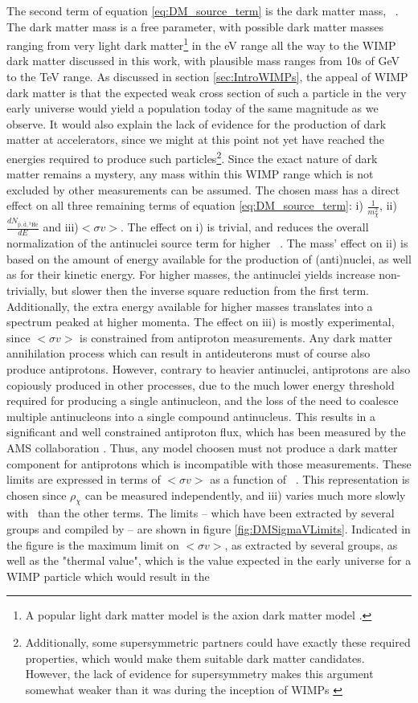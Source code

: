 The second term of equation \ref{eq:DM_source_term} is the dark matter mass, \dmm\ . The dark matter mass is a free parameter, with possible dark matter masses ranging from very light dark matter\footnote{A popular light dark matter model is the axion dark matter model \cite{}.} in the eV range all the way to the WIMP dark matter discussed in this work, with plausible mass ranges from 10s of GeV to the TeV range. As discussed in section \ref{sec:IntroWIMPs}, the appeal of WIMP dark matter is that the expected weak cross section of such a particle in the very early universe would yield a population today of the same magnitude as we observe. It would also explain the lack of evidence for the production of dark matter at accelerators, since we might at this point not yet have reached the energies required to produce such particles\footnote{Additionally, some supersymmetric partners could have exactly these required properties, which would make them suitable dark matter candidates\cite{}. However, the lack of evidence for supersymmetry makes this argument somewhat weaker than it was during the inception of WIMPs \cite{}}. Since the exact nature of dark matter remains a mystery, any mass within this WIMP range which is not excluded by other measurements can be assumed. The chosen mass has a direct effect on all three remaining terms of equation \ref{eq:DM_source_term}: i) $\frac{1}{m_\chi^2}$, ii) $\frac{dN_{\mathrm{\bar{p}, \bar{d}, {^3\overline{He}}}}}{dE}$  and iii)$<\sigma v>$. The effect on i) is trivial, and reduces the overall normalization of the antinuclei source term for higher \dmm\ . The mass' effect on ii) is based on the amount of energy available for the production of (anti)nuclei, as well as for their kinetic energy. For higher masses, the antinuclei yields increase non-trivially, but slower then the inverse square reduction from the first term. Additionally, the extra energy available for higher masses translates into a spectrum peaked at higher momenta. The effect on iii) is mostly experimental, since $<\sigma v>$ is constrained from antiproton measurements. Any dark matter annihilation process which can result in antideuterons must of course also produce antiprotons. However, contrary to heavier antinuclei, antiprotons are also copiously produced in other processes, due to the much lower energy threshold required for producing a single antinucleon, and the loss of the need to coalesce multiple antinucleons into a single compound antinucleus. This results in a significant and well constrained antiproton flux, which has been measured by the AMS collaboration \cite{}. Thus, any model choosen must not produce a dark matter component for antiprotons which is incompatible with those measurements. These limits are expressed in terms of $<\sigma v>$ as a function of \dmm\ . This representation is chosen since $\rho_\chi$ can be measured independently, and iii) varies much more slowly with \dmm\ than the other terms. The limits -- which have been extracted by several groups \cite{} and compiled by \cite{}-- are shown in figure \ref{fig:DMSigmaVLimits}. Indicated in the figure is the maximum limit on $<\sigma v>$, as extracted by several groups, as well as the "thermal value", which is the value expected in the early universe for a WIMP particle which would result in the 